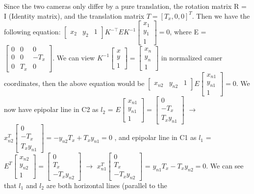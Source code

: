 \begin{your_solution}[title=Q1.2,height=6cm,width=\linewidth]
\scriptsize
Since the two cameras only differ by a pure translation, the rotation matrix R = I (Identity matrix), and the translation matrix $T = [T_x, 0, 0]^T$. Then we have the following equation: $\begin{bmatrix} x_2 & y_2 & 1 \end{bmatrix} K^{-\top} E K^{-1} \begin{bmatrix} x_1 \\ y_1 \\ 1 \end{bmatrix}=0$, where E = $\begin{bmatrix} 0 & 0 & 0 \\ 0 & 0 & -T_x \\ 0 & T_x & 0 \end{bmatrix}$. We can view $K^{-1} \begin{bmatrix} x \\ y \\ 1 \end{bmatrix} = \begin{bmatrix} x_n \\ y_n \\ 1 \end{bmatrix}$ in normalized camer coordinates, then the above equation would be $\begin{bmatrix} x_{n2} & y_{n2} & 1 \end{bmatrix} E \begin{bmatrix} x_{n1} \\ y_{n1} \\ 1 \end{bmatrix}=0$. We now have epipolar line in C2 as $l_2$ = $E \begin{bmatrix} x_{n1} \\ y_{n1} \\ 1 \end{bmatrix} = \begin{bmatrix} 0 \\ -T_x \\ T_xy_{n1} \end{bmatrix}$ $\rightarrow$ $x_{n2}^T\begin{bmatrix} 0 \\ -T_x \\ T_xy_{n1} \end{bmatrix} = -y_{n2}T_x + T_xy_{n1} = 0$ , and epipolar line in C1 as $l_1$ = $E^T \begin{bmatrix} x_{n2} \\ y_{n2} \\ 1 \end{bmatrix} = \begin{bmatrix} 0 \\ T_x \\ -T_xy_{n2} \end{bmatrix}$ $\rightarrow$ $x_{n1}^T\begin{bmatrix} 0 \\ T_x \\ -T_xy_{n2} \end{bmatrix}$ = $y_{n1}T_x - T_xy_{n2} = 0$. We can see that $l_1$ and $l_2$  are both horizontal lines (parallel to the 
\end{your_solution}
